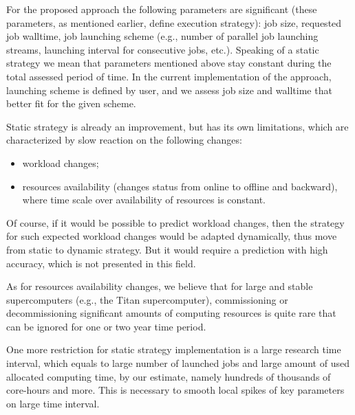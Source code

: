 For the proposed approach the following parameters are significant (these parameters, as mentioned earlier, define execution strategy): job size, requested job walltime, job launching scheme (e.g., number of parallel job launching streams, launching interval for consecutive jobs, etc.). Speaking of a static strategy we mean that parameters mentioned above stay constant during the total assessed period of time. In the current implementation of the approach, launching scheme is defined by user, and we assess job size and walltime that better fit for the given scheme.

Static strategy is already an improvement, but has its own limitations, which are characterized by slow reaction on the following changes:
\begin{itemize}
    \item workload changes;
    \item resources availability (changes status from online to offline and backward), where time scale over availability of resources is constant.
\end{itemize}

Of course, if it would be possible to predict workload changes, then the strategy for such expected workload changes would be adapted dynamically, thus move from static to dynamic strategy. But it would require a prediction with high accuracy, which is not presented in this field.

As for resources availability changes, we believe that for large and stable supercomputers (e.g., the Titan supercomputer), commissioning or decommissioning significant amounts of computing resources is quite rare that can be ignored for one or two year time period.

One more restriction for static strategy implementation is a large research time interval, which equals to large number of launched jobs and large amount of used allocated computing time, by our estimate, namely hundreds of thousands of core-hours and more. This is necessary to smooth local spikes of key parameters on large time interval.

